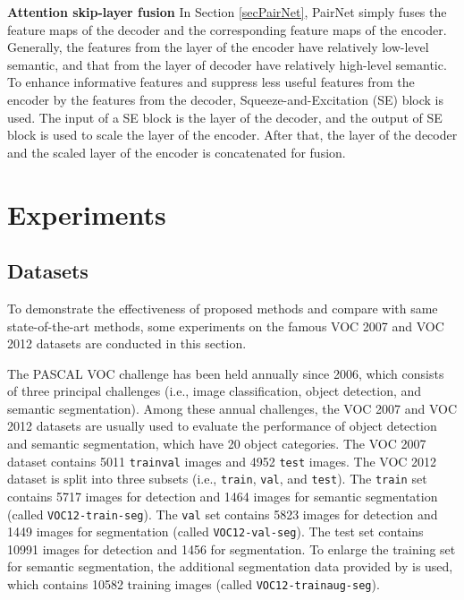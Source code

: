 \documentclass[10pt,twocolumn,letterpaper]{article}
\begin{document}
\textbf{Attention skip-layer fusion} In Section \ref{secPairNet}, PairNet simply fuses the feature maps of the decoder and the corresponding feature maps of the encoder. Generally, the features from the layer of the encoder have relatively low-level semantic, and that from the layer of decoder have relatively high-level semantic. To enhance informative features and suppress less useful features from the encoder by the features from the decoder, Squeeze-and-Excitation (SE) \cite{Hu_SENet_CVPR_2017} block is used. The input of a SE block is the layer of the decoder, and the output of SE block is used to scale the layer of the encoder. After that, the layer of the decoder and the scaled layer of the encoder is concatenated for fusion.     

\section{Experiments}
\label{secExperiments}
\subsection{Datasets}
To demonstrate the effectiveness of proposed methods and compare with same state-of-the-art methods, some experiments on the famous VOC 2007 and VOC 2012 datasets \cite{Everingham_VOC_IJCV_2010} are conducted in this section. 

The PASCAL VOC challenge \cite{Everingham_VOC_IJCV_2010} has been held annually since 2006, which consists of three principal challenges (i.e., image classification, object detection, and semantic segmentation). Among these annual challenges, the VOC 2007 and VOC 2012 datasets are usually used to evaluate the performance of object detection and semantic segmentation, which have 20 object categories. The VOC 2007 dataset contains 5011 \texttt{trainval} images and 4952 \texttt{test} images. The VOC 2012 dataset is split into three subsets (i.e., \texttt{train}, \texttt{val}, and \texttt{test}). The \texttt{train} set contains 5717 images for detection and 1464 images for semantic segmentation (called \texttt{VOC12-train-seg}). The \texttt{val} set contains 5823 images for detection and 1449 images for segmentation (called \texttt{VOC12-val-seg}). The test set contains 10991 images for detection and 1456 for segmentation. To enlarge the training set for semantic segmentation, the additional segmentation data provided by \cite{Harihar_SBD_ICCV_2011} is used, which contains 10582 training images (called \texttt{VOC12-trainaug-seg}).
\end{document}
